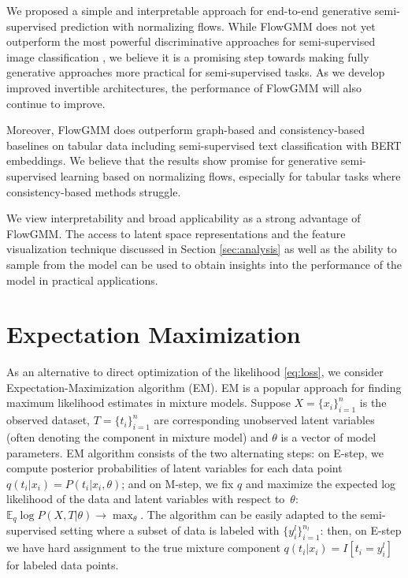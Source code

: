 \documentclass{article}
\newcommand{\method}{FlowGMM\xspace}
\begin{document}
We proposed a simple and interpretable approach for end-to-end generative semi-supervised prediction with normalizing flows. While \method does not yet outperform the most powerful discriminative approaches for semi-supervised image classification \citep{athiwaratkun2018there, verma2019interpolation}, we believe it is a promising step towards making fully generative approaches more practical for semi-supervised tasks. As we develop improved invertible architectures, the performance of \method will also continue to improve.

Moreover, \method does outperform graph-based and consistency-based baselines on tabular data including semi-supervised text classification with BERT embeddings.
We believe that the results show promise for generative semi-supervised learning based on normalizing flows, especially for tabular tasks where consistency-based methods struggle. 

We view interpretability and broad applicability as a strong advantage of \method.
The access to latent space representations and the feature visualization technique discussed in Section \ref{sec:analysis} as well as the ability to sample from the model can be used to obtain insights into the performance of the model in practical applications.






\cleardoublepage
\appendix

\section{Expectation Maximization}\label{sec:em}


As an alternative to direct optimization of the likelihood \eqref{eq:loss}, we consider Expectation-Maximization algorithm (EM). EM is a popular approach for finding maximum likelihood estimates in mixture models. Suppose $X=\{x_i\}_{i=1}^n$ is the observed dataset, $T = \{t_i\}_{i=1}^n$ are corresponding unobserved latent variables (often denoting the component in mixture model) and $\theta$ is a vector of model parameters. EM algorithm consists of the two alternating steps: on E-step, we compute posterior probabilities of latent variables for each data point
$q(t_i | x_i) = P(t_i | x_i, \theta)$;
and on M-step, we fix $q$ and maximize the expected log likelihood of the data and latent variables with respect to~$\theta$:
$\mathbb{E}_q \log P(X, T | \theta) \rightarrow \max_{\theta}.$
The algorithm can be easily adapted to the semi-supervised setting where a subset of data is labeled with $\{y_i^l\}_{i=1}^{n_l}$: then, on E-step we have hard assignment to the true mixture component $q(t_i | x_i) = I[t_i = y_i^l]$ for labeled data points.
\end{document}
